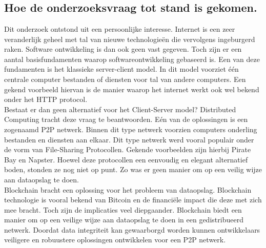 
\chapter{}
\label{ch:methodologie}

\section{Hoe de onderzoeksvraag tot stand is gekomen.}
\label{POC_introduction}
Dit onderzoek ontstond uit een persoonlijke interesse. Internet is een zeer veranderlijk geheel met tal van nieuwe technologieën die vervolgens ingeburgerd raken. Software ontwikkeling is dan ook geen vast gegeven. Toch zijn er een aantal basisfundamenten waarop softwareontwikkeling gebaseerd is. Een van deze fundamenten is het klassieke server-client model. In dit model voorziet één centrale computer bestanden of diensten voor tal van andere computers. Een gekend voorbeeld hiervan is de manier waarop het internet werkt ook wel bekend onder het HTTP protocol.\\

Bestaat er dan geen alternatief voor het Client-Server model? Distributed Computing tracht deze vraag te beantwoorden. Eén van de oplossingen is een zogenaamd P2P netwerk. Binnen dit type netwerk voorzien computers onderling bestanden en diensten aan elkaar. Dit type netwerk werd vooral populair onder de vorm van File-Sharing Protocollen. Gekende voorbeelden zijn hierbij Pirate Bay en Napster. Hoewel deze protocollen een eenvoudig en elegant alternatief boden, stonden ze nog niet op punt. Zo was er geen manier om op een veilig wijze aan dataopslag te doen.\\

Blockchain bracht een oplossing voor het probleem van dataopslag. Blockchain technologie is vooral bekend van Bitcoin en de financiële impact die deze met zich mee bracht. Toch zijn de implicaties veel diepgaander. Blockchain biedt een manier om op een veilige wijze aan dataopslag te doen in een gedistribueerd netwerk. Doordat data integriteit kan gewaarborgd worden kunnen ontwikkelaars veiligere en robuustere oplossingen ontwikkelen voor een P2P netwerk.\\

